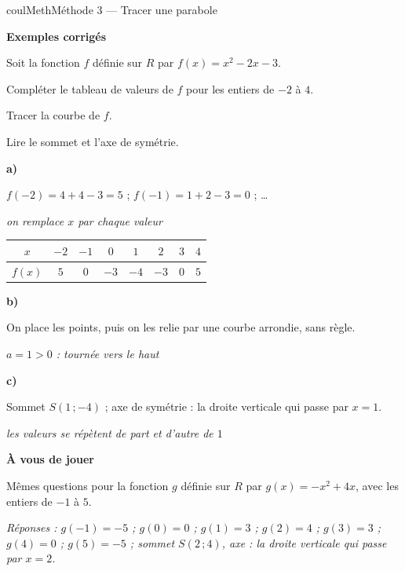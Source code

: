 \documentclass[11pt,a4paper]{article}
\makeatletter
\newcommand{\R}{\mathbb{R}}
\newcommand{\N}{\mathbb{N}}
\newcommand{\Z}{\mathbb{Z}}
\newcommand{\Q}{\mathbb{Q}}
\newcommand{\vect}[1]{\overrightarrow{#1}}
\newcommand{\fois}[1]{\times{\color{coulExo}#1}}
\newcommand{\lycee@repere}[4]{%
  \draw[grille,step=1] (#1,#2) grid (#3,#4);
  \draw[-{Stealth[length=2mm]},thick] (#1,0)--({#3+0.4},0) node[below left=-1pt]{$x$};
  \draw[-{Stealth[length=2mm]},thick] (0,#2)--(0,{#4+0.4}) node[below left=-1pt]{$y$};
  \node[below left,font=\scriptsize,inner sep=1.5pt] at (0,0) {$0$};}
\newcommand{\lycee@gradx}[1]{\foreach \k/\l in {#1}{%
  \draw (\k,0.07)--(\k,-0.07) node[below,font=\scriptsize,inner sep=1.5pt]{$\l$};}}
\newcommand{\lycee@grady}[1]{\foreach \k/\l in {#1}{%
  \draw (0.07,\k)--(-0.07,\k) node[left,font=\scriptsize,inner sep=1.5pt]{$\l$};}}
\providecommand{\repere}{\lycee@repere}%
\providecommand{\gradx}{\lycee@gradx}%
\providecommand{\grady}{\lycee@grady}%
\providecommand{\Cf}{\mathcal{C}\sb{f}}%
\providecommand{\Cg}{\mathcal{C}\sb{g}}%
\newcounter{lycee@signet}
\newcommand{\signet}[3][]{\stepcounter{lycee@signet}%
  \edef\lycee@dest{\if\relax\detokenize{#1}\relax
    signet.\arabic{lycee@signet}\else#1\fi}%
  \hypertarget{\lycee@dest}{}\bookmark[level=#2,dest=\lycee@dest]{#3}}
\def\R{R}\def\N{N}\def\Z{Z}\def\Q{Q}\def\vect#1{#1}\def\Cf{Cf}\def\Cg{Cg}\def\fois#1{×#1}%
\newcommand{\res}[1]{#1}
\newcounter{methode}
\newenvironment{methodebox}[1][Méthode]{\stepcounter{methode}%
  \begin{boitecours}[phantom={\signet[methode-\arabic{methode}]{2}{#1}}]{coulMeth}{#1}}%
  {\end{boitecours}}
\newcommand{\etape}[1]{\par\smallskip\textbf{\color{coulMeth}#1}\par\nobreak\smallskip}
\newcommand{\reponse}[1]{\par\smallskip
  {\footnotesize\itshape\color{black!55}Réponses : #1}}
\newcommand{\explique}[2]{\par\smallskip\noindent
  \begin{minipage}[t]{0.57\linewidth}\raggedright #1\end{minipage}\hfill
  \begin{minipage}[t]{0.40\linewidth}\raggedright\leavevmode
    {\small\itshape\color{black!60}#2}\end{minipage}\par}
\newcommand{\cas}[1]{\par\smallskip\noindent\textbf{\color{coulExo}#1}\vadjust{\nobreak}}
\newenvironment{correction}{\par}{\par}
\newcommand{\etapeexemples}{\etape{Exemples corrigés}}
\makeatother
\begin{document}
\begin{methodebox}[Méthode 3 --- Tracer une parabole]
\etapeexemples
Soit la fonction $f$ définie sur $\R$ par $f(x)=x^{2}-2x-3$.
\begin{questions}[label=\alph*)]
  \item Compléter le tableau de valeurs de $f$ pour les entiers de $-2$ à $4$.
  \item Tracer la courbe de $f$.
  \item Lire le sommet et l'axe de symétrie.
\end{questions}
\begin{correction}
\cas{a)}\par\nopagebreak
\begin{minipage}[c]{0.58\linewidth}\raggedright
\explique{$f(-2)=4+4-3=5$ ; $f(-1)=1+2-3=0$ ; …}{on remplace $x$ par chaque valeur}
\begin{center}\small
\renewcommand{\arraystretch}{1.3}
\begin{tabular}{|c|c|c|c|c|c|c|c|}
\hline
$x$ & $-2$ & $-1$ & $0$ & $1$ & $2$ & $3$ & $4$\\
\hline
$f(x)$ & $5$ & $0$ & $-3$ & $-4$ & $-3$ & $0$ & $5$\\
\hline
\end{tabular}
\end{center}
\cas{b)}
\explique{On place les points, puis on les relie par une courbe arrondie, sans
règle.}{$a=1>0$ : tournée vers le haut}
\cas{c)}
\explique{Sommet \res{$S(1\,;-4)$} ; axe de symétrie : \res{la droite verticale qui passe par
$x=1$}.}{les valeurs se répètent de part et d'autre de $1$}
\end{minipage}\hfill
\begin{minipage}[c]{0.38\linewidth}\centering
{}
\end{minipage}
\end{correction}

\etape{À vous de jouer}
Mêmes questions pour la fonction $g$ définie sur $\R$ par $g(x)=-x^{2}+4x$, avec les entiers de $-1$ à $5$.
\reponse{$g(-1)=-5$ ; $g(0)=0$ ; $g(1)=3$ ; $g(2)=4$ ; $g(3)=3$ ; $g(4)=0$ ; $g(5)=-5$ ;\;
sommet $S(2\,;4)$, axe : la droite verticale qui passe par $x=2$.}
\end{methodebox}
\end{document}
